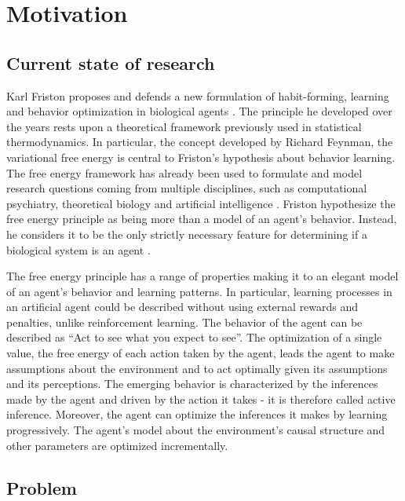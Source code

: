 \documentclass[11pt,
  paper=a4,
  bibliography=totocnumbered,
	captions=tableheading,
	BCOR=10mm
]{scrreprt}
\theoremstyle{definition}
\begin{document}
\vspace{4cm}

\tableofcontents
\thispagestyle{empty}

\chapter{Motivation}
\section{Current state of research}

Karl Friston proposes and defends a new formulation of habit-forming, learning and behavior optimization in biological agents \cite{Friston2006}. The principle he developed over the years rests upon a theoretical framework previously used in statistical thermodynamics. In particular, the concept developed by Richard Feynman, the variational free energy is central to Friston's hypothesis about behavior learning. The free energy framework has already been used to formulate and model research questions coming from multiple disciplines, such as computational psychiatry, theoretical biology and artificial intelligence \cite{Friston2016}. Friston hypothesize the free energy principle as being more than a model of an agent's behavior. Instead, he considers it to be the only strictly necessary feature for determining if a biological system is an agent \cite{Friston2010}.

The free energy principle has a range of properties making it to an elegant model of an agent's behavior and learning patterns. In particular, learning processes in an artificial agent could be described without using external rewards and penalties, unlike reinforcement learning. The behavior of the agent can be described as ``Act to see what you expect to see''. The optimization of a single value, the free energy of each action taken by the agent, leads the agent to make assumptions about the environment and to act optimally given its assumptions and its perceptions. The emerging behavior is characterized by the inferences made by the agent and driven by the action it takes - it is therefore called active inference. Moreover, the agent can optimize the inferences it makes by learning progressively. The agent's model about the environment's causal structure and other parameters are optimized incrementally.

\section{Problem}
\end{document}
